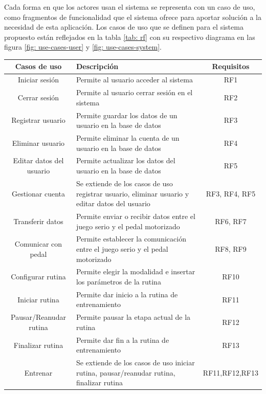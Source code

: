 Cada forma en que los actores usan el sistema se representa con un caso de uso, como fragmentos de funcionalidad que el sistema ofrece para aportar solución a la necesidad de esta aplicación. Los casos de uso que se definen para el sistema propuesto están reflejados en la tabla \ref{tab: rf} con su respectivo diagrama en las figura \ref{fig: use-cases-user} y \ref{fig: use-cases-system}.
\begin{table}[!ht]
    \centering
    \begin{tabularx}{\textwidth}{|c|X|c|}
        \hline
        \textbf{Casos de uso} & \textbf{Descripción} & \textbf{Requisitos}\\\hline
        Iniciar sesión & Permite al usuario acceder al sistema & RF1\\\hline
        Cerrar sesión & Permite al usuario cerrar sesión en el sistema & RF2\\\hline
        Registrar usuario & Permite guardar los datos de un usuario en la base de datos & RF3\\\hline
        Eliminar usuario & Permite eliminar la cuenta de un usuario en la base de datos & RF4\\\hline
        Editar datos del usuario & Permite actualizar los datos del usuario en la base de datos & RF5\\\hline
        Gestionar cuenta  & Se extiende de los casos de uso registrar usuario, eliminar usuario y editar datos del usuario & RF3, RF4, RF5 \\\hline
        Transferir datos & Permite enviar o recibir datos entre el juego serio y el pedal motorizado & RF6, RF7\\\hline
        Comunicar con pedal & Permite establecer la comunicación entre el juego serio y el pedal motorizado & RF8, RF9\\\hline
        Configurar rutina & Permite elegir la modalidad e insertar los parámetros de la rutina  & RF10\\\hline
        Iniciar rutina & Permite dar inicio a la rutina de entrenamiento & RF11\\\hline
        Pausar/Reanudar rutina & Permite pausar la etapa actual de la rutina & RF12\\\hline
        Finalizar rutina & Permite dar fin a la rutina de entrenamiento & RF13\\\hline
        Entrenar & Se extiende de los casos de uso  iniciar rutina, pausar/reanudar rutina, finalizar rutina&RF11,RF12,RF13\\\hline

\end{tabularx}
\end{table}
